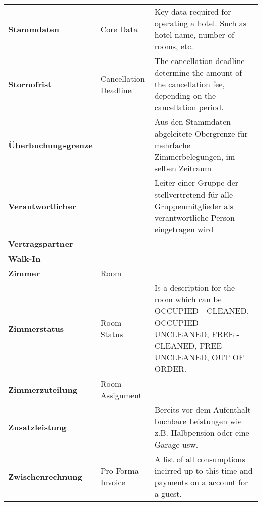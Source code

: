 \documentclass[../Pflichtenheft.tex]{subfiles}
\begin{document}
\begin{longtable}{p{4cm} p{4cm} p{6cm}}
        \textbf{Stammdaten} & {Core Data} & Key data required for operating a hotel. Such as hotel name, number of rooms, etc. \\[0.5cm]
        \textbf{Stornofrist} & {Cancellation Deadline} & The cancellation deadline determine the amount of the cancellation fee, depending on the cancellation period. \\[0.5cm]
        \textbf{Überbuchungsgrenze} & & Aus den Stammdaten abgeleitete Obergrenze für mehrfache Zimmerbelegungen, im selben Zeitraum \\[0.5cm]
        \textbf{Verantwortlicher} & & Leiter einer Gruppe der stellvertretend für alle Gruppenmitglieder als verantwortliche Person eingetragen wird \\[0.5cm]
        \textbf{Vertragspartner} & \\[0.5cm]
        \textbf{Walk-In} & \\[0.5cm]
        \textbf{Zimmer} & {Room} & \\[0.5cm]
        \textbf{Zimmerstatus} & {Room Status} & Is a description for the room which can be OCCUPIED - CLEANED, OCCUPIED - UNCLEANED, FREE - CLEANED, FREE - UNCLEANED, OUT OF ORDER. \\[0.5cm]
		\textbf{Zimmerzuteilung} & {Room Assignment} & \\[0.5cm]
        \textbf{Zusatzleistung} & & Bereits vor dem Aufenthalt buchbare Leistungen wie z.B. Halbpension oder eine Garage usw.\\[0.5cm]
        \textbf{Zwischenrechnung} & {Pro Forma Invoice} & A list of all consumptions incirred up to this time and payments on a account for a guest. \\[0.5cm]
		\end{longtable}
\end{document}
